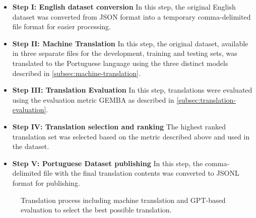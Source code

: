 \documentclass[runningheads]{llncs}
\begin{document}
\begin{itemize}
    \item \textbf{Step I: English dataset conversion} In this step, the original English dataset was converted from JSON format into a temporary  comma-delimited file format for easier processing. 
    \item \textbf{Step II: Machine Translation} In this step, the original
    dataset, available in three separate files for the development, training and testing sets, was translated to the Portuguese language using the three distinct models described in \ref{subsec:machine-translation}.
    \item \textbf{Step III: Translation Evaluation} In this step, translations were evaluated using the evaluation metric GEMBA as described in \ref{subsec:translation-evaluation}.
    \item \textbf{Step IV: Translation selection and ranking} The highest ranked translation set was selected based on the metric described above and used in the dataset.
    \item \textbf{Step V: Portuguese Dataset publishing}  In this step, the
    comma-delimited file with the final translation contents was converted to JSONL format for publishing.
\end{itemize}

\begin{figure}[htbp]
    \centering
    \caption{Translation process including machine
    translation and GPT-based evaluation to select the best possible
    translation.}\label{fig:diagram}
\end{figure}
\FloatBarrier
\end{document}
